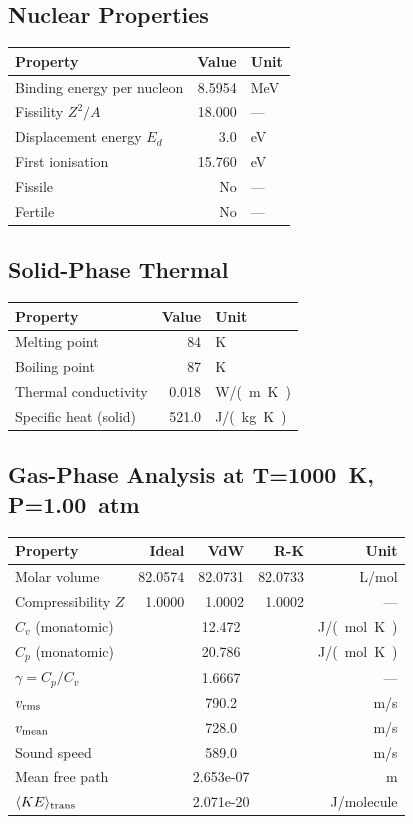 \documentclass[11pt,a4paper]{article}
\begin{document}
\subsection{Nuclear Properties}
\begin{tabular}{lrl}
  \toprule
  Property & Value & Unit \\
  \midrule
  Binding energy per nucleon & 8.5954 & \si{MeV} \\
  Fissility $Z^2/A$ & 18.000 & --- \\
  Displacement energy $E_d$ & 3.0 & \si{eV} \\
  First ionisation & 15.760 & \si{eV} \\
  Fissile & No & --- \\
  Fertile & No & --- \\
  \bottomrule
\end{tabular}

\subsection{Solid-Phase Thermal}
\begin{tabular}{lrl}
  \toprule
  Property & Value & Unit \\
  \midrule
  Melting point & 84 & \si{K} \\
  Boiling point & 87 & \si{K} \\
  Thermal conductivity & 0.018 & \si{W/(m.K)} \\
  Specific heat (solid) & 521.0 & \si{J/(kg.K)} \\
  \bottomrule
\end{tabular}

\subsection{Gas-Phase Analysis at T=\SI{1000}{K}, P=\SI{1.00}{atm}}
\begin{tabular}{lrrrr}
  \toprule
  Property & Ideal & VdW & R-K & Unit \\
  \midrule
  Molar volume & 82.0574 & 82.0731 & 82.0733 & \si{L/mol} \\
  Compressibility $Z$ & 1.0000 & 1.0002 & 1.0002 & --- \\
  \midrule
  $C_v$ (monatomic) & \multicolumn{3}{c}{12.472} & \si{J/(mol.K)} \\
  $C_p$ (monatomic) & \multicolumn{3}{c}{20.786} & \si{J/(mol.K)} \\
  $\gamma = C_p/C_v$ & \multicolumn{3}{c}{1.6667} & --- \\
  $v_{\rm rms}$ & \multicolumn{3}{c}{790.2} & \si{m/s} \\
  $v_{\rm mean}$ & \multicolumn{3}{c}{728.0} & \si{m/s} \\
  Sound speed & \multicolumn{3}{c}{589.0} & \si{m/s} \\
  Mean free path & \multicolumn{3}{c}{2.653e-07} & \si{m} \\
  $\langle KE \rangle_{\rm trans}$ & \multicolumn{3}{c}{2.071e-20} & \si{J/molecule} \\
  \bottomrule
\end{tabular}
\end{document}
